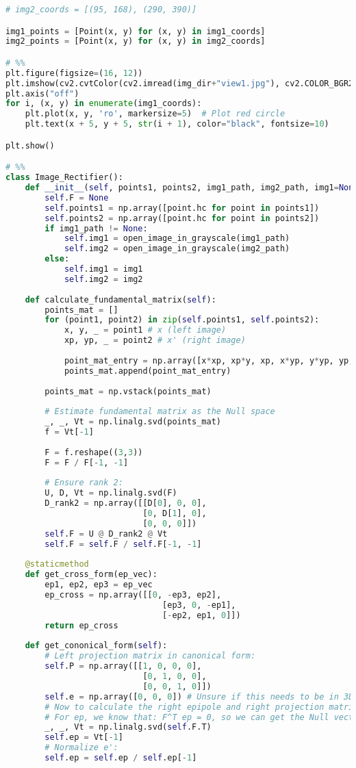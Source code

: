 \documentclass{article}
\begin{document}
\begin{lstlisting}[language=Python]
# img2_coords = [(95, 168), (290, 390)]

img1_points = [Point(x, y) for (x, y) in img1_coords]
img2_points = [Point(x, y) for (x, y) in img2_coords]

# %%
plt.figure(figsize=(16, 12))
plt.imshow(cv2.cvtColor(cv2.imread(img_dir+"view1.jpg"), cv2.COLOR_BGR2RGB))
plt.axis("off")
for i, (x, y) in enumerate(img1_coords):
    plt.plot(x, y, 'ro', markersize=5)  # Plot red circle
    plt.text(x + 5, y + 5, str(i + 1), color="black", fontsize=10)

plt.show()

# %%
class Image_Rectifier():
    def __init__(self, points1, points2, img1_path, img2_path, img1=None, img2=None):
        self.F = None
        self.points1 = np.array([point.hc for point in points1])
        self.points2 = np.array([point.hc for point in points2])
        if img1_path != None:
            self.img1 = open_image_in_grayscale(img1_path)
            self.img2 = open_image_in_grayscale(img2_path)
        else:
            self.img1 = img1
            self.img2 = img2
        
    def calculate_fundamental_matrix(self):
        points_mat = []
        for (point1, point2) in zip(self.points1, self.points2):
            x, y, _ = point1 # x (left image)
            xp, yp, _ = point2 # x' (right image)
            
            point_mat_entry = np.array([x*xp, xp*y, xp, x*yp, y*yp, yp, x, y, 1])
            points_mat.append(point_mat_entry)
            
        points_mat = np.vstack(points_mat)
        
        # Estimate fundamental matrix as the Null space
        _, _, Vt = np.linalg.svd(points_mat)
        f = Vt[-1]
        
        F = f.reshape((3,3))
        F = F / F[-1, -1]
        
        # Ensure rank 2:
        U, D, Vt = np.linalg.svd(F)
        D_rank2 = np.array([[D[0], 0, 0],
                            [0, D[1], 0],
                            [0, 0, 0]])
        self.F = U @ D_rank2 @ Vt
        self.F = self.F / self.F[-1, -1]
        
    @staticmethod
    def get_cross_form(ep_vec):
        ep1, ep2, ep3 = ep_vec
        ep_cross = np.array([[0, -ep3, ep2],
                                [ep3, 0, -ep1],
                                [-ep2, ep1, 0]])
        return ep_cross
    
    def get_cononical_form(self):
        # Left projection matrix in canonical form:
        self.P = np.array([[1, 0, 0, 0],
                            [0, 1, 0, 0],
                            [0, 0, 1, 0]])
        self.e = np.array([0, 0, 0]) # Unsure if this needs to be in 3D coords or HC
        # Now to calculate the right epipole and right projection matrix
        # For ep, we know that: F^T ep = 0, so we can get the Null vector to solve this:
        _, _, Vt = np.linalg.svd(self.F.T)
        self.ep = Vt[-1]
        # Normalize e':
        self.ep = self.ep / self.ep[-1]
        

\end{lstlisting}
\end{document}
